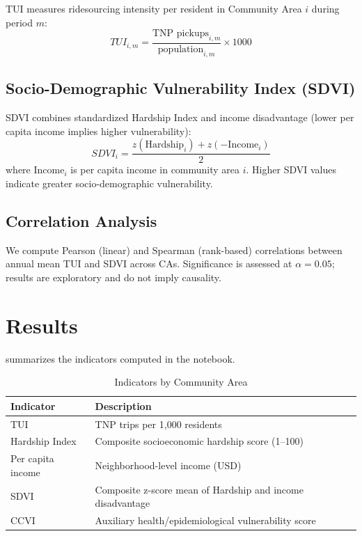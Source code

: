\documentclass[9pt,a4paper,twocolumn,twoside]{rho-class/rho}
\begin{document}
        TUI measures ridesourcing intensity per resident in Community Area $i$ during period $m$:
        \begin{equation}\label{eq:tui}
            TUI_{i,m} = \frac{\text{TNP pickups}_{i,m}}{\text{population}_{i,m}} \times 1000
        \end{equation}

    \subsection{Socio-Demographic Vulnerability Index (SDVI)}

        SDVI combines standardized Hardship Index and income disadvantage (lower per capita income implies higher vulnerability):
        \begin{equation}\label{eq:sdvi}
            SDVI_i = \frac{z(\text{Hardship}_i) + z(-\text{Income}_i)}{2}
        \end{equation}
        where $\text{Income}_i$ is per capita income in community area $i$. Higher SDVI values indicate greater socio-demographic vulnerability.

    \subsection{Correlation Analysis}

        We compute Pearson (linear) and Spearman (rank-based) correlations between annual mean TUI and SDVI across CAs. Significance is assessed at $\alpha = 0.05$; results are exploratory and do not imply causality.

\section{Results}

     summarizes the indicators computed in the notebook.

    \begin{table}[H]
        \caption{Indicators by Community Area}
        \label{tab:indicators}
        \begin{tabular}{
            >{\raggedright\arraybackslash}p{}
            >{\raggedright\arraybackslash}p{}
        }
        \toprule
        \textbf{Indicator} & \textbf{Description} \\
        \midrule
        TUI & TNP trips per 1{,}000 residents \\
        Hardship Index & Composite socioeconomic hardship score (1--100) \\
        Per capita income & Neighborhood-level income (USD) \\
        SDVI & Composite z-score mean of Hardship and income disadvantage \\
        CCVI & Auxiliary health/epidemiological vulnerability score \\
        \bottomrule
        \end{tabular}
    \end{table}
\end{document}
